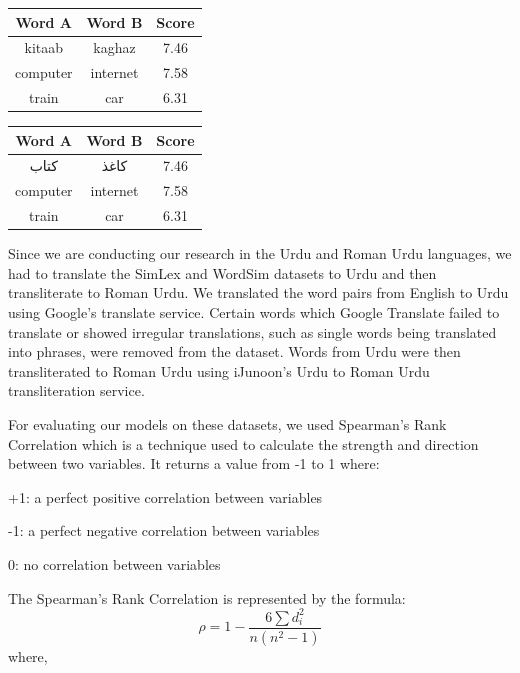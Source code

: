 \documentclass[format=acmsmall,review=true,screen=true]{acmart}
\begin{document}
    \begin{left}
    \begin{tabular}{ |c|c|c| } 
    \hline
    Word A & Word B & Score \\
    \hline
    kitaab & kaghaz & 7.46 \\ 
    computer & internet & 7.58 \\
    train & car & 6.31 \\
    \hline
    \end{tabular}
    \end{left}
    
    \begin{right}
    \begin{tabular}{ |c|c|c| } 
    \hline
    Word A & Word B & Score \\
    \hline
    کتاب &کاغذ & 7.46 \\ 
    computer & internet & 7.58 \\
    train & car & 6.31 \\
    \hline
    \end{tabular}
    \end{right}
    
    
    Since we are conducting our research in the Urdu and Roman Urdu languages, we had to translate the SimLex and WordSim datasets to Urdu and then transliterate to Roman Urdu. We translated the word pairs from English to Urdu using Google’s translate service. Certain words which Google Translate failed to translate or showed irregular translations, such as single words being translated into phrases, were removed from the dataset. Words from Urdu were then transliterated to Roman Urdu using iJunoon’s Urdu to Roman Urdu transliteration service.
    
    For evaluating our models on these datasets, we used Spearman’s Rank Correlation which is a technique used to calculate the strength and direction between two variables. It returns a value from -1 to 1 where:

    +1:	a perfect positive correlation between variables
    
    -1:	a perfect negative correlation between variables
    
    0: no correlation between variables
     
    The Spearman’s Rank Correlation is represented by the formula:
    \begin{equation*}
    \rho = 1-\frac{6\sum d^2_i}{n(n^2 - 1)}
    \end{equation*}
    where,
    
\end{document}
